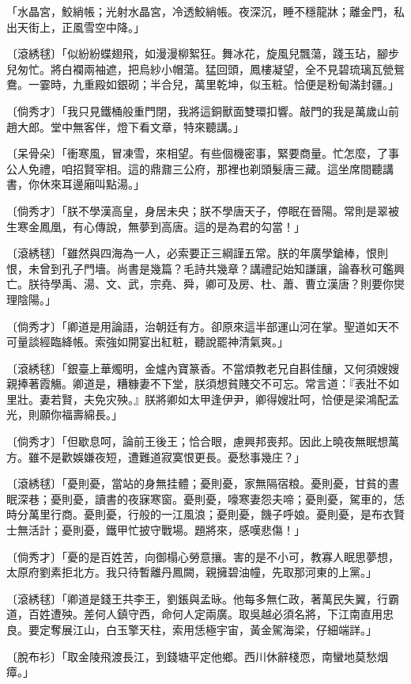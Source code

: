 「水晶宮，鮫綃帳；光射水晶宮，冷透鮫綃帳。夜深沉，睡不穩龍牀；離金門，私出天街上，正風雪空中降。」

〔滾綉毬〕「似紛紛蝶翅飛，如漫漫柳絮狂。舞冰花，旋風兒飄蕩，踐玉玷，腳步兒匆忙。將白襴兩袖遮，把烏紗小帽蕩。猛回頭，鳳樓凝望，全不見碧琉璃瓦甇鴛鴦。一霎時，九重殿如銀砌；半合兒，萬里乾坤，似玉粧。恰便是粉甸滿封疆。」

〔倘秀才〕「我只見鐵桶般重門閉，我將這銅獸面雙環扣響。敲門的我是萬歲山前趙大郎。堂中無客伴，燈下看文章，特來聽講。」

〔呆骨朵〕「衝寒風，冒凍雪，來相望。有些個機密事，緊要商量。忙怎麼，了事公人免禮，咱招賢宰相。這的鼎鼐三公府，那裡也剃頭髮唐三藏。這坐席間聽講書，你休來耳邊廂叫點湯。」

〔倘秀才〕「朕不學漢高皇，身居未央；朕不學唐天子，停眠在晉陽。常則是翠被生寒金鳳凰，有心傳說，無夢到高唐。這的是為君的勾當！」

〔滾綉毬〕「雖然與四海為一人，必索要正三綱謹五常。朕的年廣學鎗棒，恨則恨，未曾到孔子門墻。尚書是幾篇？毛詩共幾章？講禮記始知謙讓，論春秋可鑑興亡。朕待學禹、湯、文、武，宗堯、舜，卿可及房、杜、蕭、曹立漢唐？則要你爕理陰陽。」

〔倘秀才〕「卿道是用論語，治朝廷有方。卻原來這半部運山河在掌。聖道如天不可量談經臨絳帳。索強如開宴出紅粧，聽說罷神清氣爽。」

〔滾綉毬〕「銀臺上華燭明，金爐內寶篆香。不當煩教老兄自斟佳釀，又何須嫂嫂親捧著霞觴。卿道是，糟糠妻不下堂，朕須想貧賤交不可忘。常言道：『表壯不如里壯。妻若賢，夫免灾殃。』朕將卿如太甲逢伊尹，卿得嫂壯呵，恰便是梁鴻配孟光，則願你福壽綿長。」

〔倘秀才〕「但歇息呵，論前王後王；恰合眼，慮興邦喪邦。因此上曉夜無眠想萬方。雖不是歡娛嫌夜短，遭難道寂寞恨更長。憂愁事幾庄？」

〔滾綉毬〕「憂則憂，當站的身無挂體；憂則憂，家無隔宿粮。憂則憂，甘貧的晝眠深巷；憂則憂，讀書的夜寐寒窗。憂則憂，嚎寒妻怨夫啼；憂則憂，駕車的，恁時分萬里行商。憂則憂，行般的一江風浪；憂則憂，饑子呼娘。憂則憂，是布衣賢士無活計；憂則憂，鐵甲忙披守戰場。題將來，感嘆悲傷！」

〔倘秀才〕「憂的是百姓苦，向御榻心勞意攘。害的是不小可，教寡人眠思夢想，太原府劉素拒北方。我只待暫離丹鳳闕，親擁碧油幢，先取那河東的上黨。」

〔滾綉毬〕「卿道是錢王共李王，劉鋹與孟昹。他每多無仁政，著萬民失翼，行霸道，百姓遭殃。差何人鎮守西，命何人定兩廣。取吳越必須名將，下江南直用忠良。要定奪展江山，白玉擎天柱，索用恁極宇宙，黃金駕海梁，仔細端詳。」

〔脫布衫〕「取金陵飛渡長江，到錢塘平定他鄉。西川休辭棧恧，南蠻地莫愁烟瘴。」

